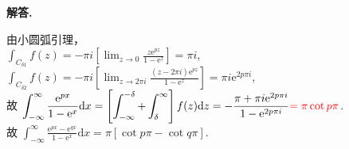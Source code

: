 \documentclass[11pt]{ctexart}
\newenvironment{solution}{\par\noindent\textbf{解答. }}{\par}
\begin{document}
\begin{solution}
\begin{enumerate}[(1)]
              由小圆弧引理， \\[12pt]
              $\displaystyle\int_{C_{\delta1}}f(z) = -\pi i\left[\lim_{z\to0}\frac{z\text{e}^{pz}}{1-\text{e}^z}\right] = \pi i$,
              $\displaystyle\int_{C_{\delta2}}f(z) = -\pi i\left[\lim_{z\to2\pi i}\frac{(z-2\pi i)\text{e}^{pz}}{1-\text{e}^z}\right] = \pi i\text{e}^{2p\pi i}$, \\[12pt]
              故 $\displaystyle\int_{-\infty}^{\infty}\frac{\text{e}^{px}}{1-\text{e}^x}\text{d}x 
              = \left[\int_{-\infty}^{-\delta} + \int_{\delta}^{\infty}\right]f(z)\text{d}z
              = -\frac{\pi + \pi i\text{e}^{2p\pi i}}{1 -\text{e}^{2p\pi i}}\textcolor{red}{=\pi\cot{p\pi}}$. \\[12pt]
              故 $\displaystyle\int_{-\infty}^{\infty}\frac{\text{e}^{px}-\text{e}^{qx}}{1-\text{e}^x}\text{d}x
              = \pi\left[\cot{p\pi}-\cot{q\pi}\right]$.
    \end{enumerate}
\end{solution}
\end{document}
